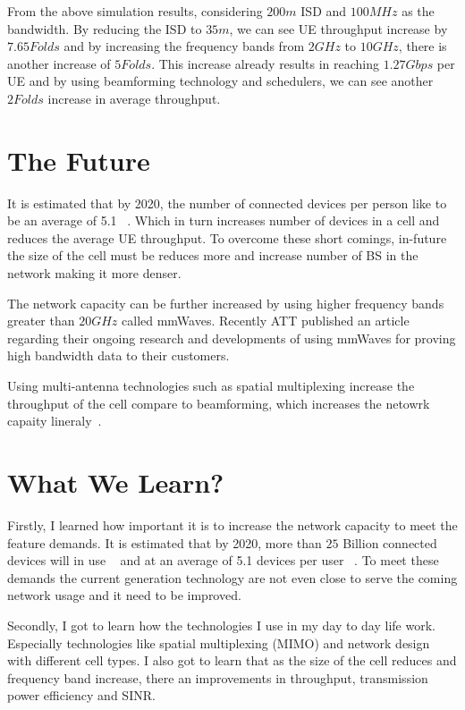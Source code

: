 \documentclass[12pt,onecolumn]{IEEEtran}
\begin{document}
From the above simulation results, considering $200m$ ISD and $100MHz$ as the bandwidth. By reducing the ISD to $35m$, we can see UE throughput increase by $7.65Folds$ and by increasing the frequency bands from $2GHz$ to $10GHz$, there is another increase of $5Folds$. This increase already results in reaching $1.27Gbps$ per UE and by using beamforming technology and schedulers, we can see another $2Folds$ increase in average throughput.

\section{The Future}
\label{sec:TF}

It is estimated that by 2020, the number of connected devices per person like to be an average of 5.1 ~\cite{main_paper}. Which in turn increases number of devices in a cell and reduces the average UE throughput. To overcome these short comings, in-future the size of the cell must be reduces more and increase number of BS in the network making it more denser.

The network capacity can be further increased by using higher frequency bands greater than $20GHz$ called mmWaves. Recently ATT published an article ~\cite{att} regarding their ongoing research and developments of using mmWaves for proving high bandwidth data to their customers.

Using multi-antenna technologies such as spatial multiplexing increase the throughput of the cell compare to beamforming, which increases the netowrk capaity lineraly~\cite{satial_mul}.

\section{What We Learn?}
\label{sec:WWL}

Firstly, I learned how important it is to increase the network capacity to meet the feature demands. It is estimated that by 2020, more than $25$ Billion connected devices will in use ~\cite{Gartner} and at an average of 5.1 devices per user ~\cite{frost_sullivan}. To meet these demands the current generation technology are not even close to serve the coming network usage and it need to be improved.

Secondly, I got to learn how the technologies I use in my day to day life work. Especially technologies like spatial multiplexing (MIMO) and network design with different cell types. I also got to learn that as the size of the cell reduces and frequency band increase, there an improvements in throughput, transmission power efficiency and SINR.
\end{document}
